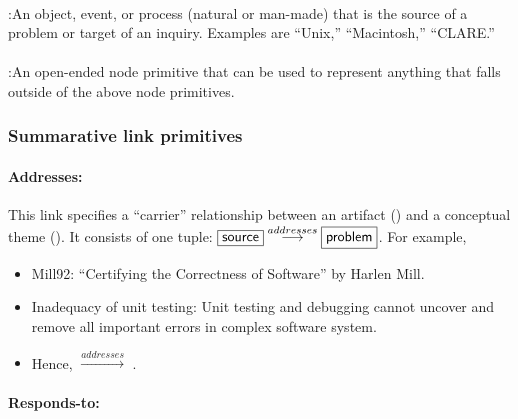 \paragraph{}

\noindent{}:\hspace{.2in}An object, event, or process
(natural or man-made) that is the source of a problem or target of an
inquiry. Examples are ``Unix,'' ``Macintosh,'' ``CLARE.''

\paragraph{}

\noindent{}:\hspace{.2in}An open-ended node primitive that
can be used to represent anything that falls outside of the above node
primitives.


\subsubsection{Summarative link primitives}

\paragraph{Addresses:}

This link specifies a ``carrier'' relationship between an artifact
() and a conceptual theme (). It
consists of one tuple: \( \fbox{{\sf source}}
\stackrel{addresses}{\longrightarrow} \fbox{{\sf problem}} \). For example,

\small{
\begin{itemize}
  
\item {\sf Mill92}: ``Certifying the Correctness of Software'' by Harlen
  Mill.
  
\item {\sf Inadequacy of unit testing}: Unit testing and debugging cannot
  uncover and remove all important errors in complex software system.
  
\item Hence, \hspace{.1in} \(
  \stackrel{addresses}{\longrightarrow} \) .
\end{itemize}
}

\paragraph{Responds-to:}

